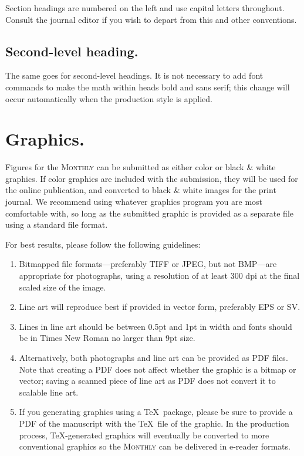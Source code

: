 \documentclass{article}
\theoremstyle{theorem}
\theoremstyle{definition}
\begin{document}
Section headings are numbered on the left and use capital letters throughout. Consult the journal editor if you wish to depart from this and other conventions.

\subsection{Second-level heading.}

The same goes for second-level headings.  It is not necessary to add font commands to make the math within heads bold and sans serif; this change will occur automatically when the production style is applied.

\section{Graphics.}

Figures for the \textsc{Monthly} can be submitted as either color or black \& white graphics.  If color graphics are included with the submission, they will be used for the online publication, and converted to black \& white images for the print journal.  We recommend using whatever graphics program you are most comfortable with, so long as the submitted graphic is provided as a separate file using a standard file format.

For best results, please follow the following guidelines:
\begin{enumerate}
\item Bitmapped file formats---preferably TIFF or JPEG, but not BMP---are appropriate for photographs, using a resolution of at least 300 dpi at the final scaled size of the image.
\item Line art will reproduce best if provided in vector form, preferably EPS or SV.
\item Lines in line art should be between 0.5pt and 1pt in width and fonts should be in Times New Roman no larger than 9pt size.
\item Alternatively, both photographs and line art can be provided as PDF files.  Note that creating a PDF does not affect whether the graphic is a bitmap or vector; saving a scanned piece of line art as PDF does not convert it to scalable line art.
\item If you generating graphics using a \TeX\ package, please be sure to provide a PDF of the manuscript with the \TeX\ file of the graphic.  In the production process, \TeX-generated graphics will eventually be converted to more conventional graphics so the \textsc{Monthly} can be delivered in e-reader formats.
\end{enumerate}
\end{document}
